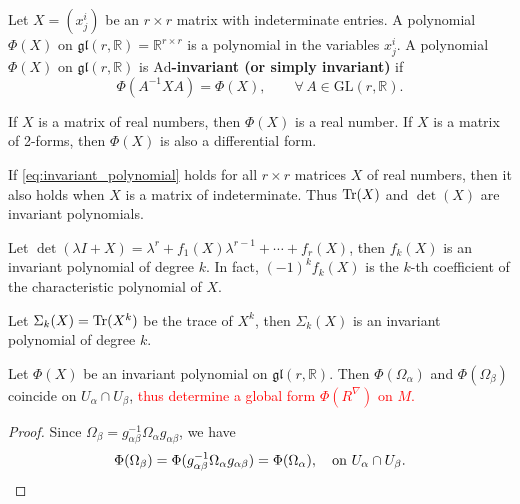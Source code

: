 \begin{definition}
    Let $X = (x^i_j)$ be an $r\times r$ matrix with indeterminate entries. 
    A polynomial $\Phi(X)$ on $\mathfrak{gl}(r,\mathbb{R})=\mathbb{R}^{r\times r}$ is a polynomial in the variables $x^i_j$. 
    A polynomial $\Phi(X)$ on $\mathfrak{gl}(r,\mathbb{R})$ is \textbf{$\mathrm{Ad}$-invariant (or simply invariant)} if
    \begin{equation}\label{eq:invariant_polynomial}
        \Phi(A^{-1}XA) = \Phi(X), \qquad \forall\, A\in\mathrm{GL}(r,\mathbb{R}).
    \end{equation}
\end{definition}
\begin{remark}
    If $X$ is a matrix of real numbers, then $\Phi(X)$ is a real number. 
    If $X$ is a matrix of 2-forms, then $\Phi(X)$ is also a differential form.
\end{remark}
\begin{fact}
    If \eqref{eq:invariant_polynomial} holds for all $r\times r$ matrices $X$ of real numbers, 
    then it also holds when $X$ is a matrix of indeterminate. 
    Thus ${\rm Tr}(X)$ and $\det(X)$ are invariant polynomials.
\end{fact}
\begin{example}
    Let $\det(\lambda I + X) = \lambda^r + f_1(X)\lambda^{r-1} + \cdots + f_r(X)$, 
    then $f_k(X)$ is an invariant polynomial of degree $k$. 
    In fact, $(-1)^kf_k(X)$ is the $k$-th coefficient of the characteristic polynomial of $X$. 
\end{example}
\begin{example}
    Let $\Sigma_k(X)={\rm Tr}(X^k)$ be the trace of $X^k$, then $\Sigma_k(X)$ is an invariant polynomial of degree $k$.
\end{example}

\begin{proposition}\label{prop:global_form}
    Let $\Phi(X)$ be an invariant polynomial on $\mathfrak{gl}(r,\mathbb{R})$. 
    Then $\Phi(\Omega_\alpha)$ and $\Phi(\Omega_\beta)$ coincide on $U_\alpha\cap U_\beta$, 
    \textcolor{red}{thus determine a global form $\Phi(R^\nabla)$ on $M$.}
\end{proposition}
\begin{proof}
    Since $\Omega_\beta = g_{\alpha\beta}^{-1}\Omega_\alpha g_{\alpha\beta}$, 
    we have 
    \begin{equation*}
        \Phi(\Omega_\beta) = \Phi(g_{\alpha\beta}^{-1}\Omega_\alpha g_{\alpha\beta}) = \Phi(\Omega_\alpha),
        \quad \text{on } U_\alpha\cap U_\beta. \qedhere
    \end{equation*}
\end{proof}

